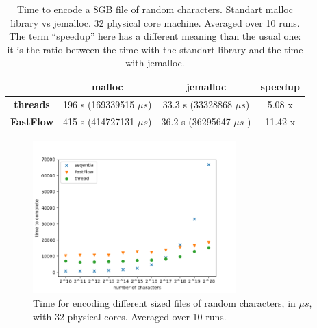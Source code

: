 \documentclass[12pt, letterpaper]{article}
\begin{document}
\begin{table}[h]
    \begin{center}
    \begin{tabular}{c c c c}
        & \textbf{malloc} & \textbf{jemalloc} & speedup\\
        \hline
        \textbf{threads} & 196 s (169339515 $\mu s$)  & 33.3 s  (33328868 $\mu s$) & 5.08 x \\
        \hline
        \textbf{FastFlow} &  415 s  (414727131 $\mu s$) & 36.2 s (36295647 $\mu s$ ) & 11.42 x \\
        \hline
    \end{tabular}
\caption{Time to encode a 8GB file of random characters. Standart malloc library vs jemalloc. 32 physical core machine. Averaged over 10 runs. The term ``speedup'' here has a different meaning than the usual one: it is the ratio between the time with the standart library and the time with jemalloc.}    
\label{tab:jemalloc}
\end{center}
\end{table}

\begin{figure}
    \centering
    \includegraphics[width=0.7\textwidth]{./images/small._files.png}
    \caption{Time for encoding different sized files of random characters, in $ \mu s$, with 32 physical cores. Averaged over 10 runs.}
    \label{fig:small_files}
\end{figure}






\newpage \FloatBarrier


\end{document}
